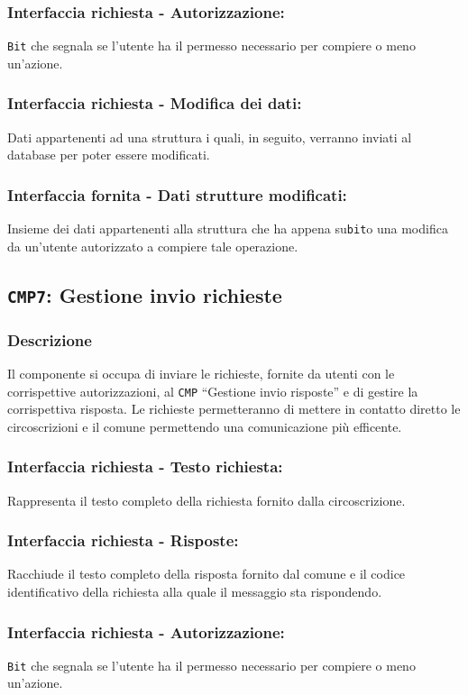         \subsubsection{Interfaccia richiesta - Autorizzazione:}
            \texttt{Bit} che segnala se l'utente ha il permesso necessario per compiere o meno un'azione.
        \subsubsection{Interfaccia richiesta - Modifica dei dati:}
            Dati appartenenti ad una struttura i quali, in seguito, verranno inviati al database per poter essere modificati.
        \subsubsection{Interfaccia fornita - Dati strutture modificati:}
            Insieme dei dati appartenenti alla struttura che ha appena su\texttt{bit}o una modifica da un'utente autorizzato a compiere tale operazione.

    \subsection{\texttt{CMP7}: Gestione invio richieste}
        \subsubsection{Descrizione}
            Il componente si occupa di inviare le richieste, fornite da utenti con le corrispettive autorizzazioni, al \texttt{CMP} ``Gestione invio risposte'' e di gestire la corrispettiva risposta. Le richieste permetteranno di mettere in contatto diretto le circoscrizioni e il comune permettendo una comunicazione più efficente.
        \subsubsection{Interfaccia richiesta - Testo richiesta:}
            Rappresenta il testo completo della richiesta fornito dalla circoscrizione.
        \subsubsection{Interfaccia richiesta - Risposte:}
            Racchiude il testo completo della risposta fornito dal comune e il codice identificativo della richiesta alla quale il messaggio sta rispondendo.
        \subsubsection{Interfaccia richiesta - Autorizzazione:}
            \texttt{Bit} che segnala se l'utente ha il permesso necessario per compiere o meno un'azione.
